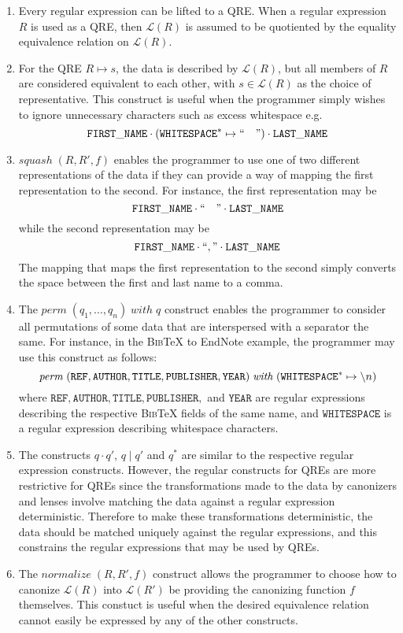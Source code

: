 \documentclass{svproc}
\newcommand{\re}[1]{\ensuremath{\mathtt{#1}}}
\newcommand{\squash}[3]{\ensuremath{\mathit{squash} \; (#1, #2, #3)}}
\newcommand{\perm}[2]{\ensuremath{\mathit{perm}\; (#1)\; \mathit{with}\; #2}}
\newcommand{\normalize}[3]{\ensuremath{\mathit{normalize} \; (#1, #2, #3)}}
\newcommand{\sep}{\ensuremath{\; | \;}}
\begin{document}
  \begin{enumerate}
    \item 
    Every regular expression can be lifted to a QRE. When a regular expression
    $R$ is used as a QRE, then $\mathcal{L}(R)$ is assumed to be quotiented by
    the equality equivalence relation on $\mathcal{L}(R)$.
    \item
    For the QRE $R \mapsto s$, the data is described by $\mathcal{L}(R)$, but
    all members of $R$ are considered equivalent to each other, with $s \in
    \mathcal{L}(R)$ as the choice of representative. This construct is useful
    when the programmer simply wishes to ignore unnecessary characters such as
    excess whitespace e.g. 
    $$\mathtt{FIRST\_NAME} \cdot (\mathtt{WHITESPACE}^* \mapsto `` \quad ")
    \cdot \mathtt{LAST\_NAME}$$
    \item
    $\squash{R}{R'}{f}$ enables the programmer to use one of two different
    representations of the data if they can provide a way of mapping the first
    representation to the second. For instance, the first representation may be
    $$\mathtt{FIRST\_NAME} \cdot `` \quad " \cdot \mathtt{LAST\_NAME}$$
    while the second representation may be
    $$\mathtt{FIRST\_NAME} \cdot ``," \cdot \mathtt{LAST\_NAME}$$
    The mapping that maps the first representation to the second simply converts
    the space between the first and last name to a comma.
    \item
    The $\perm{q_1, \ldots, q_n}{q}$ construct enables the programmer to
    consider all permutations of some data that are interspersed with a
    separator the same. For instance, in the \textsc{Bib}\TeX{} to EndNote
    example, the programmer may use this construct as follows:
    $$\perm{\re{REF}, \re{AUTHOR}, \re{TITLE}, \re{PUBLISHER},
    \re{YEAR}}{(\re{WHITESPACE}^* \mapsto \string \n)}$$
 where $\re{REF}, \re{AUTHOR}, \re{TITLE}, \re{PUBLISHER},$ and $\re{YEAR}$ are
regular expressions describing the respective \textsc{Bib}\TeX\; fields of the
same name, and $\re{WHITESPACE}$ is a regular expression describing whitespace
characters.
\item
The constructs $q \cdot q'$, $q \sep q'$ and $q^*$ are similar to the respective
regular expression constructs. However, the regular constructs for QREs are more
restrictive for QREs since the transformations made to the data by
canonizers and lenses involve matching the data against a regular expression
deterministic. Therefore to make these transformations deterministic, the
data should be matched uniquely against the regular expressions, and this
constrains the regular expressions that may be used by QREs.
\item
The $\normalize{R}{R'}{f}$ construct allows the programmer to choose how to
canonize $\mathcal{L}(R)$ into $\mathcal{L}(R')$ be providing the canonizing
function $f$ themselves. This constuct is useful when the desired equivalence
relation cannot easily be expressed by any of the other constructs.
  \end{enumerate}
\end{document}
